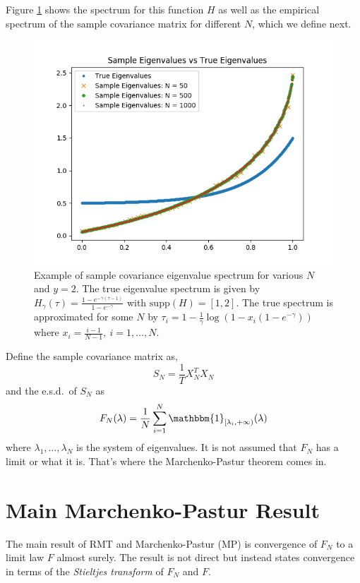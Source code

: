 \documentclass{article}
\begin{document}
Figure \ref{fig:eigs} shows the spectrum for this function $H$ as well as the
empirical spectrum of the sample covariance matrix for different $N$, which we
define next.

\begin{figure}[htbp]
	\centering
	\includegraphics[width=5in]{eigs.png}
	\caption{
		Example of sample covariance eigenvalue spectrum for various $N$ and $y=2$.
		The true eigenvalue spectrum is given by $H_\gamma(\tau) = \frac{1 -
		e^{-\gamma(\tau - 1)}}{1 - e^{-\gamma}}$ with $\mathrm{supp}(H) = [1, 2]$.
		The true spectrum is approximated for some $N$ by $\tau_i = 1 - \frac1\gamma
		\log\left( 1 - x_i(1-e^{-\gamma}) \right)$ where $x_i = \frac{i - 1}{N - 1},\
		i = 1, \ldots, N$.
	}
	\label{fig:eigs}
\end{figure}


Define the sample covariance matrix as,
$$
	S_N = \frac1T X_N^T X_N
$$
and the e.s.d.\ of $S_N$ as
$$
	F_N(\lambda)
		 = \frac{1}{N}\sum_{i=1}^N \mathbbm{1}_{[\lambda_{i}, +\infty)}(\lambda)
$$
where $\lambda_{1}, \ldots, \lambda_N$ is the system of eigenvalues.  It is not
assumed that $F_N$ has a limit or what it is.  That's where the Marchenko-Pastur
theorem comes in.


\section{Main Marchenko-Pastur Result}


The main result of RMT and Marchenko-Pastur (MP) is convergence of $F_N$ to a
limit law $F$ almost surely. The result is not direct but instead states
convergence in terms of the \emph{Stieltjes transform} of $F_N$ and $F$.
\end{document}
